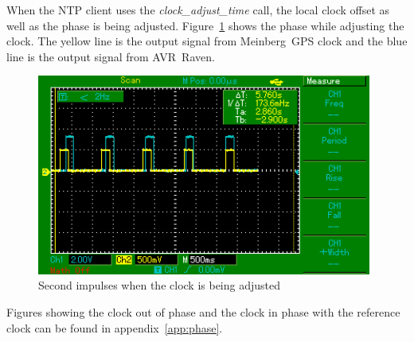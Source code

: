 When the NTP client uses the {\it{clock\_adjust\_time}} call,
the local clock offset as well as the phase is being adjusted.
Figure~\ref{fig:measurements-osc-adjusting-phase} shows the phase while adjusting the clock.
The yellow line is the output signal from Meinberg~GPS clock
and the blue line is the output signal from AVR~Raven.
\begin{figure}[H]
  \centering
  \includegraphics[width=11cm,keepaspectratio]{fig/osc-adjusting-phase.png}
  \caption{Second impulses when the clock is being adjusted}
  \label{fig:measurements-osc-adjusting-phase}
\end{figure}
Figures showing the clock out of phase and the clock in phase with
the reference clock can be found in appendix~\ref{app:phase}.
